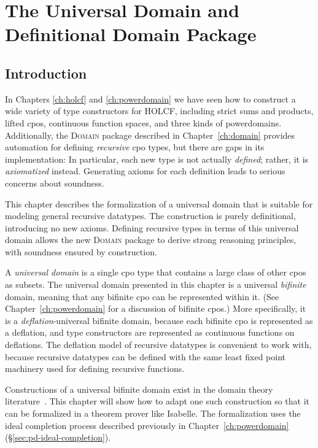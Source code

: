 \chapter{The Universal Domain and Definitional Domain Package}
\label{ch:universal}

\section{Introduction}

In Chapters \ref{ch:holcf} and \ref{ch:powerdomain} we have seen how to construct a wide variety of type constructors for HOLCF, including strict sums and products, lifted cpos, continuous function spaces, and three kinds of powerdomains. Additionally, the \textsc{Domain} package described in Chapter~\ref{ch:domain} provides automation for defining \emph{recursive} cpo types, but there are gaps in its implementation: In particular, each new type is not actually \emph{defined}; rather, it is \emph{axiomatized} instead. Generating axioms for each definition leads to serious concerns about soundness.

This chapter describes the formalization of a universal domain that is suitable for modeling general recursive datatypes. The construction is purely definitional, introducing no new axioms. Defining recursive types in terms of this universal domain allows the new \textsc{Domain} package to derive strong reasoning principles, with soundness ensured by construction.

A \emph{universal domain} is a single cpo type that contains a large class of other cpos as subsets. The universal domain presented in this chapter is a universal \emph{bifinite} domain, meaning that any bifinite cpo can be represented within it. (See Chapter~\ref{ch:powerdomain} for a discussion of bifinite cpos.) More specifically, it is a \emph{deflation}-universal bifinite domain, because each bifinite cpo is represented as a deflation, and type constructors are represented as continuous functions on deflations. The deflation model of recursive datatypes is convenient to work with, because recursive datatypes can be defined with the same least fixed point machinery used for defining recursive functions.

Constructions of a universal bifinite domain exist in the domain theory literature~\cite{gunter87universal, gunter90semantic}. This chapter will show how to adapt one such construction so that it can be formalized in a theorem prover like Isabelle. The formalization uses the ideal completion process described previously in Chapter~\ref{ch:powerdomain} (\S\ref{sec:pd-ideal-completion}).


